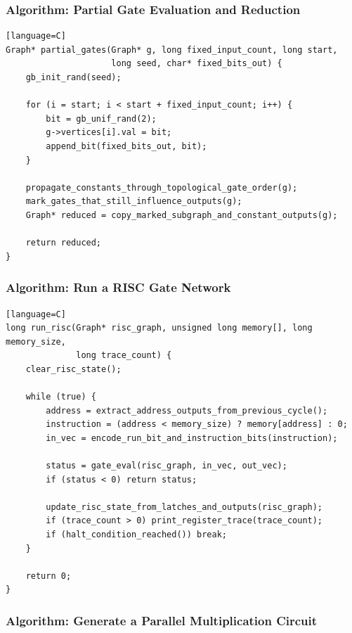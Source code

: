 \documentclass[11pt]{article}
\begin{document}
\subsubsection{Algorithm: Partial Gate Evaluation and Reduction}\label{algorithm-partial-gate-evaluation-and-reduction}

\begin{verbatim}[language=C]
Graph* partial_gates(Graph* g, long fixed_input_count, long start,
                     long seed, char* fixed_bits_out) {
    gb_init_rand(seed);

    for (i = start; i < start + fixed_input_count; i++) {
        bit = gb_unif_rand(2);
        g->vertices[i].val = bit;
        append_bit(fixed_bits_out, bit);
    }

    propagate_constants_through_topological_gate_order(g);
    mark_gates_that_still_influence_outputs(g);
    Graph* reduced = copy_marked_subgraph_and_constant_outputs(g);

    return reduced;
}
\end{verbatim}

\subsubsection{Algorithm: Run a RISC Gate Network}\label{algorithm-run-a-risc-gate-network}

\begin{verbatim}[language=C]
long run_risc(Graph* risc_graph, unsigned long memory[], long memory_size,
              long trace_count) {
    clear_risc_state();

    while (true) {
        address = extract_address_outputs_from_previous_cycle();
        instruction = (address < memory_size) ? memory[address] : 0;
        in_vec = encode_run_bit_and_instruction_bits(instruction);

        status = gate_eval(risc_graph, in_vec, out_vec);
        if (status < 0) return status;

        update_risc_state_from_latches_and_outputs(risc_graph);
        if (trace_count > 0) print_register_trace(trace_count);
        if (halt_condition_reached()) break;
    }

    return 0;
}
\end{verbatim}

\subsubsection{Algorithm: Generate a Parallel Multiplication Circuit}\label{algorithm-generate-a-parallel-multiplication-circuit}
\end{document}
